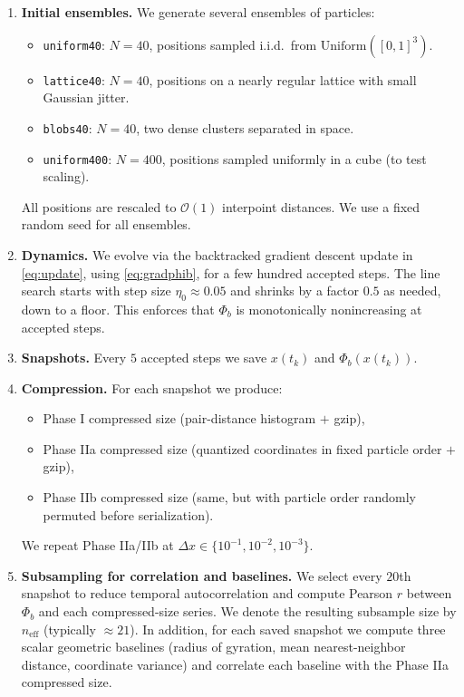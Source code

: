 \documentclass[11pt,a4paper]{article}
\numberwithin{equation}{section}
\newcommand{\phib}{\Phi_b}
\begin{document}
\begin{enumerate}[label=(E\arabic*)]

\item \textbf{Initial ensembles.}
We generate several ensembles of particles:
\begin{itemize}
\item \texttt{uniform40}: $N{=}40$, positions sampled i.i.d.\ from $\mathrm{Uniform}([0,1]^3)$.
\item \texttt{lattice40}: $N{=}40$, positions on a nearly regular lattice with small Gaussian jitter.
\item \texttt{blobs40}: $N{=}40$, two dense clusters separated in space.
\item \texttt{uniform400}: $N{=}400$, positions sampled uniformly in a cube (to test scaling).
\end{itemize}
All positions are rescaled to $\mathcal{O}(1)$ interpoint distances. We use a fixed random seed for all ensembles.

\item \textbf{Dynamics.}
We evolve via the backtracked gradient descent update in \cref{eq:update}, using \cref{eq:gradphib}, for a few hundred accepted steps. The line search starts with step size $\eta_0 \approx 0.05$ and shrinks by a factor $0.5$ as needed, down to a floor. This enforces that $\phib$ is monotonically nonincreasing at accepted steps.

\item \textbf{Snapshots.}
Every $5$ accepted steps we save $x(t_k)$ and $\phib(x(t_k))$.

\item \textbf{Compression.}
For each snapshot we produce:
\begin{itemize}
\item Phase I compressed size (pair-distance histogram $+$ gzip),
\item Phase IIa compressed size (quantized coordinates in fixed particle order $+$ gzip),
\item Phase IIb compressed size (same, but with particle order randomly permuted before serialization).
\end{itemize}
We repeat Phase IIa/IIb at $\Delta x \in \{10^{-1},10^{-2},10^{-3}\}$.

\item \textbf{Subsampling for correlation and baselines.}
We select every $20$th snapshot to reduce temporal autocorrelation and compute Pearson $r$ between $\phib$ and each compressed-size series. We denote the resulting subsample size by $n_{\text{eff}}$ (typically $\approx 21$).  
In addition, for each saved snapshot we compute three scalar geometric baselines (radius of gyration, mean nearest-neighbor distance, coordinate variance) and correlate each baseline with the Phase IIa compressed size.

\end{enumerate}
\end{document}
